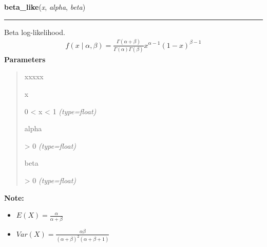 \hspace{.8\funcindent}\begin{boxedminipage}{\funcwidth}

    \raggedright \textbf{beta\_like}(\textit{x}, \textit{alpha}, \textit{beta})

    \vspace{-1.5ex}

    \rule{\textwidth}{1pt}
\setlength{\parskip}{2ex}

Beta log-likelihood.
\begin{equation*}\begin{split}f(x \mid \alpha, \beta) = \frac{\Gamma(\alpha + \beta)}{\Gamma(\alpha) \Gamma(\beta)} x^{\alpha - 1} (1 - x)^{\beta - 1}\end{split}\end{equation*}\setlength{\parskip}{1ex}
      \textbf{Parameters}
      \vspace{-1ex}

      \begin{quote}
        \begin{Ventry}{xxxxx}

          \item[x]


0 {\textless} x {\textless} 1
            {\it (type=float)}

          \item[alpha]


{\textgreater} 0
            {\it (type=float)}

          \item[beta]


{\textgreater} 0
            {\it (type=float)}

        \end{Ventry}

      \end{quote}

\textbf{Note:} \begin{itemize}
\item {} 
$E(X)=\frac{\alpha}{\alpha+\beta}$

\item {} 
$Var(X)=\frac{\alpha \beta}{(\alpha+\beta)^2(\alpha+\beta+1)}$

\end{itemize}


    \end{boxedminipage}

    \label{pymc:distributions:binomial_like}

